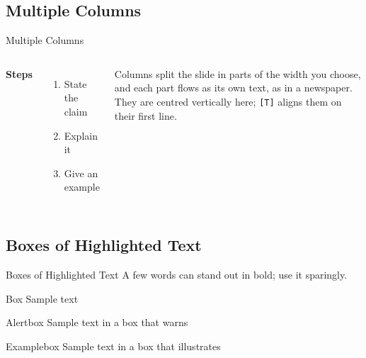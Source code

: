 \subsection{Multiple Columns}
\begin{frame}{Multiple Columns}
    \begin{columns}[c]
        \textbf{Steps}
        \begin{enumerate}
            \item State the claim
            \item Explain it
            \item Give an example
        \end{enumerate}

        Columns split the slide in parts of the width you choose, and each part flows as its own text, as in a newspaper. They are centred vertically here; \texttt{[T]} aligns them on their first line.
    \end{columns}
\end{frame}

\subsection{Boxes of Highlighted Text}
\begin{frame}{Boxes of Highlighted Text}
    A few words can stand out in \alert{bold}; use it sparingly.

    \begin{infobox}{Box}
        Sample text
    \end{infobox}

    \begin{alertbox}{Alertbox}
        Sample text in a box that warns
    \end{alertbox}

    \begin{examplebox}{Examplebox}
        Sample text in a box that illustrates
    \end{examplebox}
\end{frame}


